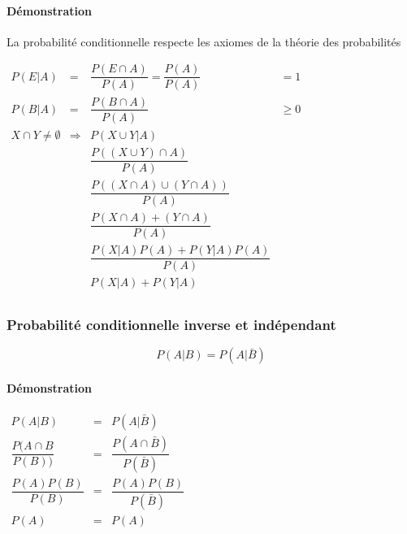 \paragraph{Démonstration}
La probabilité conditionnelle respecte les axiomes de la théorie des probabilités
\begin{center}
	$\begin{array}{LCCL}
		P(E|A) &=& \dfrac{P(E\cap A)}{P(A)} = \dfrac{P(A)}{P(A)}&=1\\
		P(B|A) &=& \dfrac{P(B\cap A)}{P(A)}&\geq0\\
		X\cap Y\neq\emptyset &\Rightarrow& P(X\cup Y |A)\\
		&&\dfrac{P((X\cup Y)\cap A)}{P(A)}\\
		&&\dfrac{P((X\cap A)\cup (Y\cap A))}{P(A)}\\
		&&\dfrac{P(X\cap A) + (Y\cap A)}{P(A)}\\
		&&\dfrac{P(X|A)P(A) + P(Y|A)P(A)}{P(A)}\\
		&&P(X|A) + P(Y|A)\\
	\end{array}$
\end{center}






\subsubsection{Probabilité conditionnelle inverse et indépendant}
$$P(A|B) = P(A|\bar{B})$$
\paragraph{Démonstration}
\begin{center}
	$\begin{array}{CCC}
		P(A|B)                   &=& P(A|\bar{B})\\
		\dfrac{P(A\cap B}{P(B))} &=& \dfrac{P(A\cap\bar{B})}{P(\bar{B})}\\
		\dfrac{P(A) P(B)}{P(B)}  &=& \dfrac{P(A)P(B)}{P(\bar{B})}\\
		P(A)                     &=& P(A)\\
	\end{array}$
\end{center}








